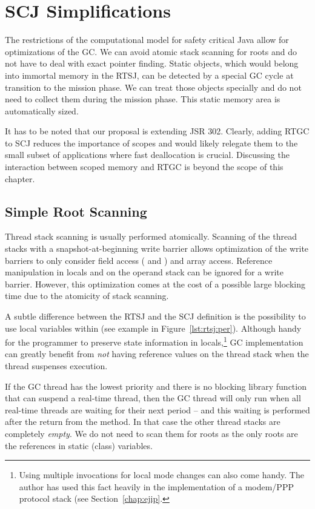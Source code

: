 \section{SCJ Simplifications} \label{sec:scj:simple}

The restrictions of the computational model for safety critical Java
allow for optimizations of the GC. We can avoid atomic stack
scanning for roots and do not have to deal with exact pointer
finding. Static objects, which would belong into immortal memory in
the RTSJ, can be detected by a special GC cycle at transition to the
mission phase. We can treat those objects specially and do not need
to collect them during the mission phase. This static memory area is
automatically sized.

It has to be noted that our proposal is extending JSR 302. Clearly,
adding RTGC to SCJ reduces the importance of scopes and would likely
relegate them to the small subset of applications where fast
deallocation is crucial. Discussing the interaction between scoped
memory  and RTGC is beyond the scope of this chapter.

\subsection{Simple Root Scanning}

Thread stack scanning is usually performed atomically. Scanning of
the thread stacks with a snapshot-at-beginning write barrier
\cite{gc:yuasa90} allows optimization of the write barriers to only
consider field access ( and ) and
array access. Reference manipulation in locals and on the operand
stack can be ignored for a write barrier. However, this optimization
comes at the cost of a possible large blocking time due to the
atomicity of stack scanning.

A subtle difference between the RTSJ and the SCJ definition is the
possibility to use local variables within  (see example
in Figure~\ref{lst:rtsj:per}). Although handy for the programmer to
preserve state information in locals,\footnote{Using multiple
 invocations for local mode changes can also come
handy. The author has used this fact heavily in the implementation
of a modem/PPP protocol stack (see Section~\ref{chap:ejip}.} GC
implementation can greatly benefit from \emph{not} having reference
values on the thread stack when the thread suspenses execution.

If the GC thread has the lowest priority and there is no blocking
library function that can suspend a real-time thread, then the GC
thread will only run when all real-time threads are waiting for
their next period -- and this waiting is performed after the return
from the  method.  In that case the other thread stacks
are completely \emph{empty}. We do not need to scan them for roots
as the only roots are the references in static (class) variables.

